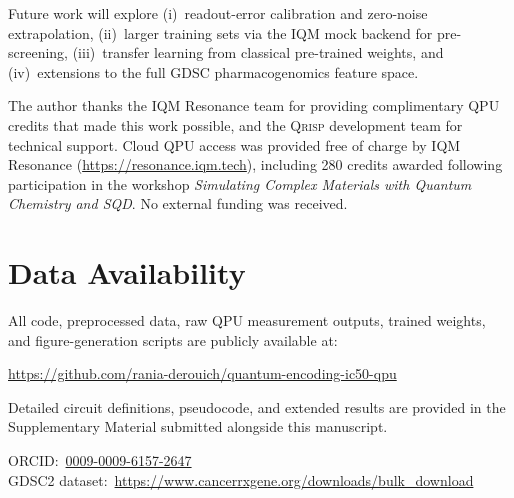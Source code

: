 \documentclass[twocolumn,aps,pra,superscriptaddress,floatfix]{revtex4-2}
\newcommand{\qrisp}{\textsc{Qrisp}}
\newcommand{\iqm}{\textsc{IQM}}
\begin{document}
Future work will explore (i)~readout-error calibration and zero-noise
extrapolation, (ii)~larger training sets via the IQM mock backend for
pre-screening, (iii)~transfer learning from classical pre-trained weights,
and (iv)~extensions to the full GDSC pharmacogenomics feature space.

\begin{acknowledgments}
The author thanks the \iqm{} Resonance team for providing complimentary QPU
credits that made this work possible, and the \qrisp{} development team for
technical support.
Cloud QPU access was provided free of charge by \iqm{} Resonance
(\url{https://resonance.iqm.tech}), including 280 credits awarded following
participation in the workshop \textit{Simulating Complex Materials with Quantum
Chemistry and SQD}.
No external funding was received.
\end{acknowledgments}

\section*{Data Availability}

All code, preprocessed data, raw QPU measurement outputs, trained weights, and
figure-generation scripts are publicly available at:
\begin{center}
\url{https://github.com/rania-derouich/quantum-encoding-ic50-qpu}
\end{center}

Detailed circuit definitions, pseudocode, and extended results are provided in
the Supplementary Material submitted alongside this manuscript.

\noindent
ORCID:~\href{https://orcid.org/0009-0009-6157-2647}{0009-0009-6157-2647}\\
GDSC2 dataset:~\url{https://www.cancerrxgene.org/downloads/bulk_download}
\end{document}
